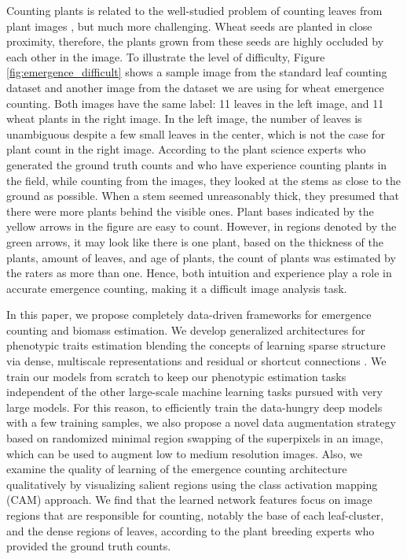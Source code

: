 \documentclass[10pt,twocolumn,letterpaper]{article}
\begin{document}
Counting plants is related to the well-studied problem of counting leaves from plant images \cite{cvppp2015_winner, aich-cvppp2017}, but much more challenging. Wheat seeds are planted in close proximity, therefore, the plants grown from these seeds are highly occluded by each other in the image. To illustrate the level of difficulty, Figure \ref{fig:emergence_difficult} shows a sample image from the standard leaf counting dataset \cite{dataset-cvppp2017-03} and another image from the dataset we are using for wheat emergence counting. Both images have the same label: 11 leaves in the left image, and 11 wheat plants in the right image. In the left image, the number of leaves is unambiguous despite a few small leaves in the center, which is not the case for plant count in the right image. According to the plant science experts who generated the ground truth counts and who have experience counting plants in the field, while counting from the images, they looked at the stems as close to the ground as possible. When a stem seemed unreasonably thick, they presumed that there were more plants behind the visible ones. Plant bases indicated by the yellow arrows in the figure are easy to count. However, in regions denoted by the green arrows, it may look like there is one plant, based on the thickness of the plants, amount of leaves, and age of plants, the count of plants was estimated by the raters as more than one. Hence, both intuition and experience play a role in accurate emergence counting, making it a difficult image analysis task.

In this paper, we propose completely data-driven frameworks for emergence counting and biomass estimation.
We develop generalized architectures for phenotypic traits estimation blending the concepts of learning sparse structure via dense, multiscale representations \cite{inception-01} and residual or shortcut connections \cite{resnet}.
We train our models from scratch to keep our phenotypic estimation tasks independent of the other large-scale machine learning tasks pursued with very large models. For this reason, to efficiently train the data-hungry deep models with a few training samples, we also propose a novel data augmentation strategy based on randomized minimal region swapping of the superpixels in an image, which can be used to augment low to medium resolution images.
Also, we examine the quality of learning of the emergence counting architecture qualitatively by visualizing salient regions using the class activation mapping (CAM) \cite{cam-mit} approach. We find that the learned network features focus on image regions that are responsible for counting, notably the base of each leaf-cluster, and the dense regions of leaves, according to the plant breeding experts who provided the ground truth counts.
\end{document}
